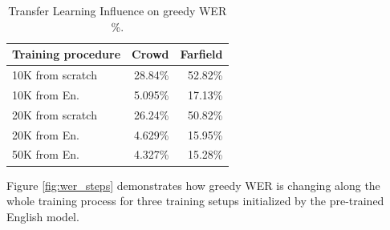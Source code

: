\documentclass[a4paper]{article}
\begin{document}
\begin{table}[t]
  \caption{Transfer Learning Influence on greedy WER \%.}
  \label{tab:wer_50k}
  \centering
  \begin{tabular}{lrr}
    \toprule
    \textbf{Training procedure } & \textbf{Crowd} & \textbf{Farfield} \\
    \midrule
    10K from scratch   &  28.84\%   & 52.82\% \\
    10K from En.    & 5.095\%       & 17.13\%  \\
    \midrule
    20K from scratch   &  26.24\%   & 50.82\% \\
    20K from En.    & 4.629\%       & 15.95\% \\
    \midrule
    50K from En.    & 4.327\%       & 15.28\% \\
    \bottomrule
  \end{tabular}
\end{table}


Figure \ref{fig:wer_steps} demonstrates how greedy WER is changing along the whole training process for three training setups initialized by the pre-trained English model.  
\end{document}
